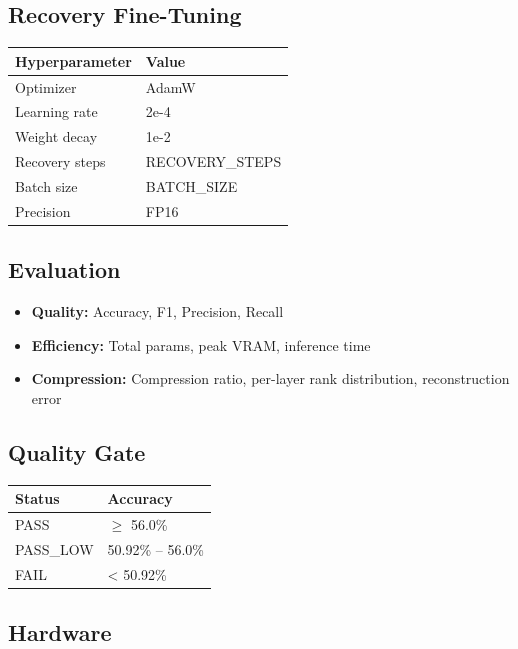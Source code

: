 \subsection{Recovery Fine-Tuning}

\begin{table}[H]
\centering
\small
\begin{tabular}{ll}
\toprule
\textbf{Hyperparameter} & \textbf{Value} \\
\midrule
Optimizer & AdamW \\
Learning rate & 2e-4 \\
Weight decay & 1e-2 \\
Recovery steps & {{RECOVERY\_STEPS}} \\
Batch size & {{BATCH\_SIZE}} \\
Precision & FP16 \\
\bottomrule
\end{tabular}
\end{table}

\subsection{Evaluation}

\begin{itemize}
\item \textbf{Quality:} Accuracy, F1, Precision, Recall
\item \textbf{Efficiency:} Total params, peak VRAM, inference time
\item \textbf{Compression:} Compression ratio, per-layer rank distribution, reconstruction error

\end{itemize}
\subsection{Quality Gate}

\begin{table}[H]
\centering
\small
\begin{tabular}{ll}
\toprule
\textbf{Status} & \textbf{Accuracy} \\
\midrule
PASS & $\ge$ 56.0\% \\
PASS\_LOW & 50.92\% -- 56.0\% \\
FAIL & < 50.92\% \\
\bottomrule
\end{tabular}
\end{table}

\subsection{Hardware}

